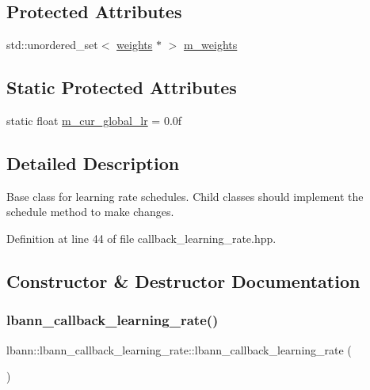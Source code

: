 \subsection*{Protected Attributes}
\begin{DoxyCompactItemize}
\item 
std\+::unordered\+\_\+set$<$ \hyperlink{classlbann_1_1weights}{weights} $\ast$ $>$ \hyperlink{classlbann_1_1lbann__callback__learning__rate_a0b02e82190e04a22ab26d858041915d7}{m\+\_\+weights}
\end{DoxyCompactItemize}
\subsection*{Static Protected Attributes}
\begin{DoxyCompactItemize}
\item 
static float \hyperlink{classlbann_1_1lbann__callback__learning__rate_a97194f282c29a748c915d9811a8a99fb}{m\+\_\+cur\+\_\+global\+\_\+lr} = 0.\+0f
\end{DoxyCompactItemize}


\subsection{Detailed Description}
Base class for learning rate schedules. Child classes should implement the schedule method to make changes. 

Definition at line 44 of file callback\+\_\+learning\+\_\+rate.\+hpp.



\subsection{Constructor \& Destructor Documentation}
\mbox{\label{classlbann_1_1lbann__callback__learning__rate_a69687cd55f4d09c480e08e18488519fe}} 
\subsubsection{\texorpdfstring{lbann\+\_\+callback\+\_\+learning\+\_\+rate()}{lbann\_callback\_learning\_rate()}\hspace{0.1cm}{\footnotesize\ttfamily [1/3]}}
{\footnotesize\ttfamily lbann\+::lbann\+\_\+callback\+\_\+learning\+\_\+rate\+::lbann\+\_\+callback\+\_\+learning\+\_\+rate (\begin{DoxyParamCaption}{ }\end{DoxyParamCaption})}




